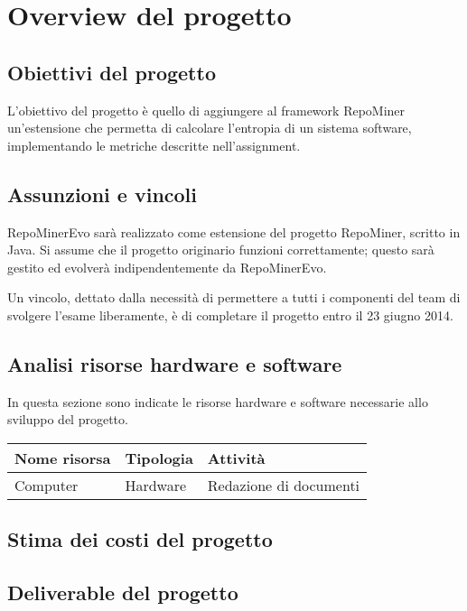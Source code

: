 \chapter{Overview del progetto}
\section{Obiettivi del progetto}
L'obiettivo del progetto è quello di aggiungere al framework RepoMiner un'estensione che permetta di calcolare l'entropia di un sistema software, implementando le metriche descritte nell'assignment.

\section{Assunzioni e vincoli}
RepoMinerEvo sarà realizzato come estensione del progetto RepoMiner, scritto in Java. Si assume che il progetto originario funzioni correttamente; questo sarà gestito ed evolverà indipendentemente da RepoMinerEvo.

Un vincolo, dettato dalla necessità di permettere a tutti i componenti del team di svolgere l'esame liberamente, è di completare il progetto entro il 23 giugno 2014. 

\section{Analisi risorse hardware e software}
In questa sezione sono indicate le risorse hardware e software necessarie allo sviluppo del progetto.

\begin{table}[b]
	\begin{tabular}{|p{5.3cm}|p{3cm}|p{5.8cm}|}
	\hline
	\textbf{Nome risorsa} & \textbf{Tipologia} & \textbf{Attività}\\
	\hline
	Computer	& Hardware	& Redazione di documenti\\
	\hline
	\end{tabular}
\end{table}

\section{Stima dei costi del progetto}
\section{Deliverable del progetto}